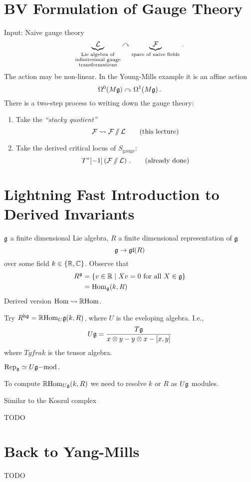 \section{BV Formulation of Gauge Theory}

Input: Naive gauge theory
\begin{equation*}
\underbrace{\mathcal{L}}_{
  \substack{\text{Lie algebra of}\\
    \text{infinitesimal gauge}\\
    \text{transformations}} } \curvearrowright
\underbrace{\mathcal{F}}_{\text{space of naive fields}}\,.
\end{equation*}
The action may be non-linear. In the Young-Mills example it is an
affine action
\begin{equation*}
  \Omega^0 (M\mathfrak{g})\curvearrowright\Omega^1 (M\mathfrak{g})\,.
\end{equation*}
There is a two-step process to writing down the gauge theory:
\begin{enumerate}
\item Take the {\em ``stacky quotient''}
  \begin{equation*}
    \mathcal{F} \rightsquigarrow \mathcal{F} \operatorname{/\mkern-6mu/} \mathcal{L} \qquad \text{(this lecture)}
  \end{equation*}
\item Take the derived critical locus of $S_\text{gauge}$:
  \begin{equation*}
    T^*[-1]\left(\mathcal{F}\operatorname{/\mkern-6mu/}\mathcal{L}\right)\,. \qquad \text{(already done)}
  \end{equation*}
\end{enumerate}

\section{Lightning Fast Introduction to Derived Invariants}
$\mathfrak{g}$ a finite dimensional Lie algebra, $R$ a finite dimensional
representation of $\mathfrak{g}$
\begin{equation*}
  \mathfrak{g}\rightarrow\mathfrak{gl} (R)
\end{equation*}
over some field $k\in\{\mathbb{R},\mathbb{C}\}$.
Observe that
\begin{align*}
  R^{\mathfrak{g}}&=\{v\in \mathbb{R} \mid Xv=0 \text{ for all } X\in\mathfrak{g} \}\\
          &=\mathrm{Hom}_{\mathfrak{g}} (k,R)
\end{align*}
Derived version $\mathrm{Hom} \rightsquigarrow \mathbb{R}\mathrm{Hom}$.

Try $R^{\mathrm{h}\mathfrak{g}}=\mathbb{R}\mathrm{Hom}_{U}\mathfrak{g} (k,R)$, where
$U$ is the eveloping algebra. I.e.,
\begin{equation*}
  U\mathfrak{g}=\frac{T\mathfrak{g}}{x\otimes{}y-y\otimes{}x-[x,y]}
\end{equation*}
where $Tgfrak$ is the tensor algebra.
\begin{fact}
  $\mathrm{Rep_{\mathfrak{g}}}\simeq U\mathfrak{g}\mathrm{-mod}\,.$
\end{fact}
To compute $\mathbb{R}\mathrm{Hom}_{U\mathfrak{g}} (k,R)$ we need to resolve $k$
or $R$ as $U\mathfrak{g}$ modules.

Similar to the Koszul complex

TODO
\section{Back to Yang-Mills}

TODO